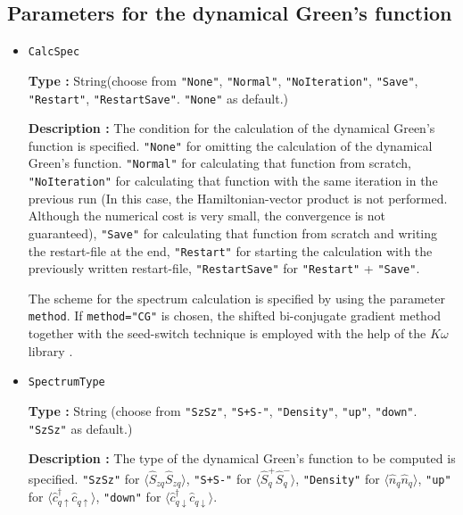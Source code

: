 \subsection{Parameters for the dynamical Green's function}

\begin{itemize}
\item \verb|CalcSpec|
  
  {\bf Type :} String(choose from \verb|"None"|, \verb|"Normal"|, \verb|"NoIteration"|,  
  \verb|"Save"|, \verb|"Restart"|, \verb|"RestartSave"|. \verb|"None"| as default.)

  {\bf Description :} The condition for the calculation of the dynamical
  Green's function is specified.
  \verb|"None"| for omitting the calculation of the
  dynamical Green's function.
  \verb|"Normal"| for calculating that function from scratch,
  \verb|"NoIteration"| for calculating that function
  with the same iteration in the previous run
  (In this case, the Hamiltonian-vector product is not performed.
  Although the numerical cost is very small, the convergence is not guaranteed),
  \verb|"Save"| for calculating that function from scratch
  and writing the restart-file at the end,
  \verb|"Restart"| for starting the calculation with the
  previously written restart-file,
  \verb|"RestartSave"| for \verb|"Restart"| + \verb|"Save"|.

  The scheme for the spectrum calculation is specified
  by using the parameter \verb|method|.
  If \verb|method="CG"| is chosen, the shifted bi-conjugate gradient method
  \cite{Frommer2003}
  together with the seed-switch technique
  \cite{doi:10.1143/JPSJ.77.114713} is employed
  with the help of the $K\omega$ library \cite{komega}.
  
\item \verb|SpectrumType|
  
  {\bf Type :} String (choose from \verb|"SzSz"|, \verb|"S+S-"|, \verb|"Density"|,  
  \verb|"up"|, \verb|"down"|. \verb|"SzSz"| as default.)

  {\bf Description :} The type of the dynamical Green's function
  to be computed is specified.
  \verb|"SzSz"| for $\langle {\hat S}_{z q} {\hat S}_{z q}\rangle$,
  \verb|"S+S-"| for $\langle {\hat S}^{+}_{q} {\hat S}^{-}_{q}\rangle$,
  \verb|"Density"| for $\langle {\hat n}_{q} {\hat n}_{q}\rangle$,
  \verb|"up"| for $\langle {\hat c}^{\dagger}_{q \uparrow} {\hat c}_{q \uparrow}\rangle$,
  \verb|"down"| for $\langle {\hat c}^{\dagger}_{q \downarrow} {\hat c}_{q \downarrow}\rangle$.


\end{itemize}
